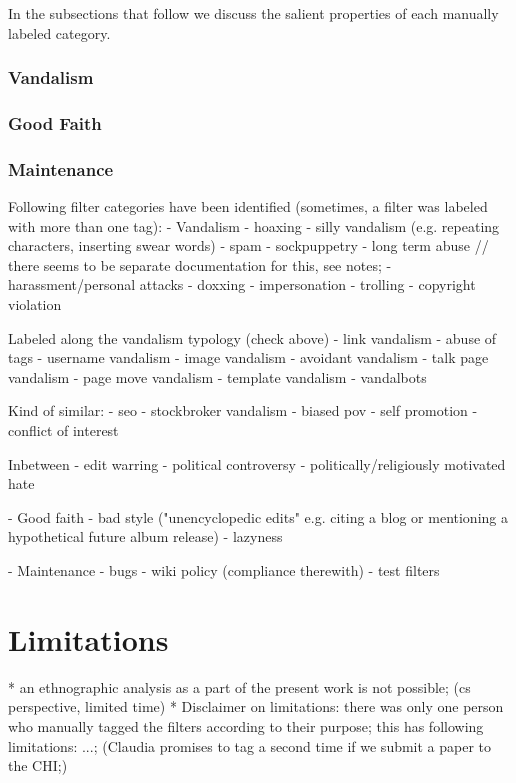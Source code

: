 \documentclass{sigchi}
\begin{document}
In the subsections that follow we discuss the salient properties of each manually labeled category.

\subsubsection{Vandalism}

\subsubsection{Good Faith}

\subsubsection{Maintenance}


Following filter categories have been identified (sometimes, a filter was labeled with more than one tag):
- Vandalism
  - hoaxing
  - silly vandalism (e.g. repeating characters, inserting swear words)
  - spam
  - sockpuppetry
  - long term abuse // there seems to be separate documentation for this, see notes;
  - harassment/personal attacks
    - doxxing
    - impersonation
  - trolling
  - copyright violation

  Labeled along the vandalism typology (check above)
  - link vandalism
  - abuse of tags
  - username vandalism
  - image vandalism
  - avoidant vandalism
  - talk page vandalism
  - page move vandalism
  - template vandalism
  - vandalbots

  Kind of similar:
  - seo
  - stockbroker vandalism
  - biased pov
  - self promotion
  - conflict of interest

Inbetween
- edit warring
- political controversy
- politically/religiously motivated hate

- Good faith
  - bad style ("unencyclopedic edits" e.g. citing a blog or mentioning a hypothetical future album release)
  - lazyness


- Maintenance
  - bugs
  - wiki policy (compliance therewith)
  - test filters

\section{Limitations}
* an ethnographic analysis as a part of the present work is not possible; (cs perspective, limited time)
* Disclaimer on limitations: there was only one person who manually tagged the filters according to their purpose; this has following limitations: ...; (Claudia promises to tag a second time if we submit a paper to the CHI;)
\end{document}
